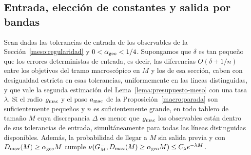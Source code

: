 \subsection{Entrada, elección de constantes y salida por bandas}\label{meso:constantes}
\begin{lema}\label{meso:entrada}
Sean dadas las tolerancias de entrada de los observables de la Sección~\ref{meso:regularidad} y
$0<\alpha_{\rm geo}<1/4$. Supongamos que $\delta$ es tan pequeño que los errores deterministas de
entrada, es
decir, las diferencias $O(\delta+1/n)$ entre los objetivos del tramo macroscópico en $M$ y los de esa
sección, caben con desigualdad estricta en esas tolerancias, uniformemente en las líneas distinguidas,
y que vale la segunda estimación del Lema~\ref{lema:presupuesto-meso} con una tasa $\lambda$. Si el
radio $\varrho_{\rm mac}$ y el paso $a_{\rm mac}$ de la Proposición~\ref{macro:parada} son
suficientemente pequeños y $n$ es suficientemente grande, en todo tablero de tamaño $M$ cuya
discrepancia $\Delta$ es menor que $\varrho_{\rm mac}$ los observables están dentro de sus
tolerancias de entrada, simultáneamente para todas las líneas distinguidas disponibles. Además, la
probabilidad de llegar a $M$ sin salida previa y con $D_{\max}(M)\ge\alpha_{\rm geo} M$ cumple
$\nu(G_M^-,D_{\max}(M)\ge\alpha_{\rm geo} M)\le C_\lambda e^{-\lambda M}$.
\end{lema}
